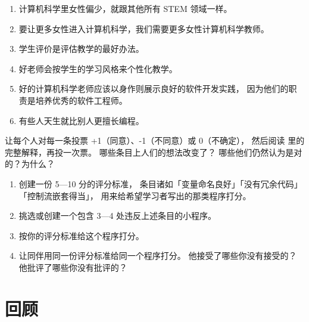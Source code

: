 \begin{enumerate}
\item
  计算机科学里女性偏少，就跟其他所有 STEM 领域一样。
\item
  要让更多女性进入计算机科学，我们需要更多女性计算机科学教师。
\item
  学生评价是评估教学的最好办法。
\item
  好老师会按学生的学习风格来个性化教学。
\item
  好的计算机科学老师应该以身作则展示良好的软件开发实践，
  因为他们的职责是培养优秀的软件工程师。
\item
  有些人天生就比别人更擅长编程。
\end{enumerate}

让每个人对每一条投票 +1（同意）、-1（不同意）或 0（不确定），
然后阅读
里的完整解释，再投一次票。
哪些条目上人们的想法改变了？
哪些他们仍然认为是对的？为什么？


\begin{enumerate}

\item
  创建一份 5—10 分的评分标准，
  条目诸如「变量命名良好」「没有冗余代码」「控制流嵌套得当」，
  用来给希望学习者写出的那类程序打分。

\item
  挑选或创建一个包含 3—4 处违反上述条目的小程序。

\item
  按你的评分标准给这个程序打分。

\item
  让同伴用同一份评分标准给同一个程序打分。
  他接受了哪些你没有接受的？
  他批评了哪些你没有批评的？

\end{enumerate}

\section*{回顾}

